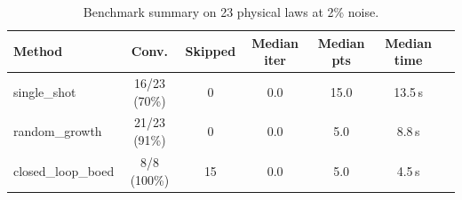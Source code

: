 \begin{table}[h]
\centering
\caption{Benchmark summary on 23 physical laws at 2\% noise.}
\begin{tabular}{lcccccc}
\hline
Method & Conv. & Skipped & Median iter & Median pts & Median time \\
\hline
single\_shot & 16/23 (70\%) & 0 & 0.0 & 15.0 & 13.5\,s \\
random\_growth & 21/23 (91\%) & 0 & 0.0 & 5.0 & 8.8\,s \\
closed\_loop\_boed & 8/8 (100\%) & 15 & 0.0 & 5.0 & 4.5\,s \\
\hline
\end{tabular}
\end{table}
